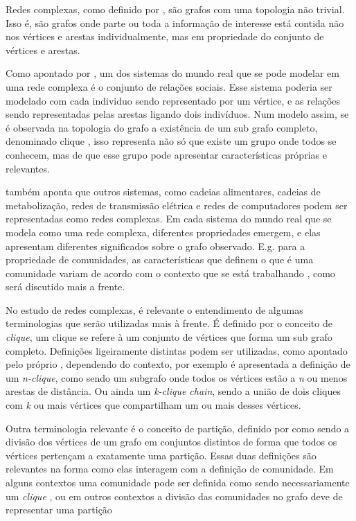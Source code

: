 \documentclass[notes.tex]{subfiles}
\begin{document}
Redes complexas, como definido por , são grafos com uma topologia não trivial.
Isso é, são grafos onde parte ou toda a informação de interesse está contida não nos vértices e arestas individualmente, mas em propriedade do conjunto de vértices e arestas.

Como apontado por , um dos sistemas do mundo real que se pode modelar em uma rede complexa é o conjunto de relações sociais.
Esse sistema poderia ser modelado com cada individuo sendo representado por um vértice, e as relações sendo representadas pelas arestas ligando dois indivíduos.
Num modelo assim, se é observada na topologia do grafo a existência de um sub grafo completo, denominado clique \cite{fortunato2010community}, isso representa não só que existe um grupo onde todos se conhecem, mas de que esse grupo pode apresentar características próprias e relevantes.

 também aponta que outros sistemas, como cadeias alimentares, cadeias de metabolização, redes de transmissão elétrica e redes de computadores podem ser representadas como redes complexas.
Em cada sistema do mundo real que se modela como uma rede complexa, diferentes propriedades emergem, e elas apresentam diferentes significados sobre o grafo observado.
E.g. para a propriedade de comunidades, as características que definem o que é uma comunidade variam de acordo com o contexto que se está trabalhando \cite{da2020comparative}, como será discutido mais a frente.

No estudo de redes complexas, é relevante o entendimento de algumas terminologias que serão utilizadas mais à frente.
É definido por  o conceito de \emph{clique}, um clique se refere à um conjunto de vértices que forma um sub grafo completo.
Definições ligeiramente distintas podem ser utilizadas, como apontado pelo próprio , dependendo do contexto, por exemplo é apresentada a definição de um \emph{n-clique}, como sendo um subgrafo onde todos os vértices estão a \emph{n} ou menos arestas de distância.
Ou ainda um \emph{k-clique chain}, sendo a união de dois cliques com \emph{k} ou mais vértices que compartilham um ou mais desses vértices.

Outra terminologia relevante é o conceito de partição, definido por  como sendo a divisão dos vértices de um grafo em conjuntos distintos de forma que todos os vértices pertençam a exatamente uma partição.
Essas duas definições são relevantes na forma como elas interagem com a definição de comunidade.
Em alguns contextos uma comunidade pode ser definida como sendo necessariamente um \emph{clique} \cite{fortunato2010community}, ou em outros contextos a divisão das comunidades no grafo deve de representar uma partição \cite{da2020comparative, fortunato2010community}
\end{document}
